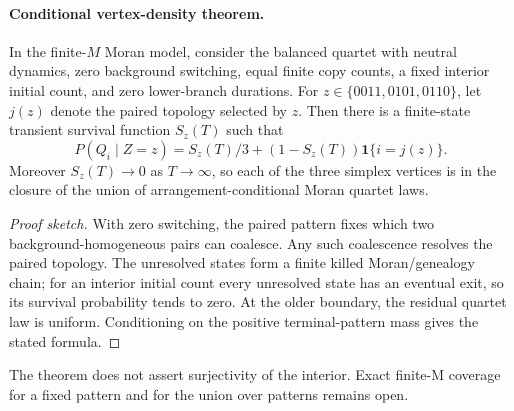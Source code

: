 \paragraph{Conditional vertex-density theorem.}
In the finite-$M$ Moran model, consider the balanced quartet with neutral
dynamics, zero background switching, equal finite copy counts, a fixed
interior initial count, and zero lower-branch durations. For
$z\in\{0011,0101,0110\}$, let $j(z)$ denote the paired topology selected by
$z$. Then there is a finite-state transient survival function $S_z(T)$ such
that
\[
P(Q_i\mid Z=z)=S_z(T)/3+(1-S_z(T))\mathbf 1\{i=j(z)\}.
\]
Moreover $S_z(T)\to0$ as $T\to\infty$, so each of the three simplex vertices
is in the closure of the union of arrangement-conditional Moran quartet laws.

\begin{proof}[Proof sketch]
With zero switching, the paired pattern fixes which two background-homogeneous
pairs can coalesce. Any such coalescence resolves the paired topology. The
unresolved states form a finite killed Moran/genealogy chain; for an interior
initial count every unresolved state has an eventual exit, so its survival
probability tends to zero. At the older boundary, the residual quartet law is
uniform. Conditioning on the positive terminal-pattern mass gives the stated
formula.
\end{proof}

The theorem does not assert surjectivity of the interior. Exact finite-M
coverage for a fixed pattern and for the union over patterns remains open.
